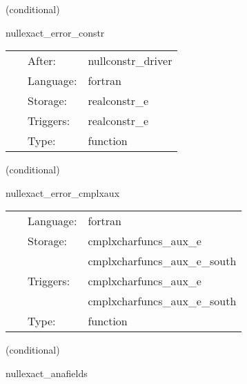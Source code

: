 \vspace{5mm}

   (conditional) 

\hspace{5mm} nullexact\_error\_constr 

\hspace{5mm}{\it error in constraints } 


\hspace{5mm}

 \begin{tabular*}{160mm}{cll} 
~ & After:  & nullconstr\_driver \\ 
~ & Language:  & fortran \\ 
~ & Storage:  & realconstr\_e \\ 
~ & Triggers:  & realconstr\_e \\ 
~ & Type:  & function \\ 
\end{tabular*} 


\vspace{5mm}

   (conditional) 

\hspace{5mm} nullexact\_error\_cmplxaux 

\hspace{5mm}{\it error in characteristic evolution variables } 


\hspace{5mm}

 \begin{tabular*}{160mm}{cll} 
~ & Language:  & fortran \\ 
~ & Storage:  & cmplxcharfuncs\_aux\_e \\ 
~& ~ &cmplxcharfuncs\_aux\_e\_south\\ 
~ & Triggers:  & cmplxcharfuncs\_aux\_e \\ 
~& ~ &cmplxcharfuncs\_aux\_e\_south\\ 
~ & Type:  & function \\ 
\end{tabular*} 


\vspace{5mm}

   (conditional) 

\hspace{5mm} nullexact\_anafields 

\hspace{5mm}{\it error in characteristic evolution variables } 


